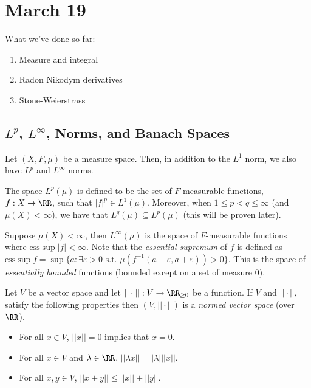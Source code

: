 \documentclass{../uva7310}
\begin{document}
\section{March 19}

What we've done so far:
\begin{enumerate}
    \item Measure and integral
    \item Radon Nikodym derivatives
    \item Stone-Weierstrass
\end{enumerate}

\subsection{\( L^p \), \( L^\infty \), Norms, and Banach Spaces}

Let \((X,F,\mu)\) be a measure space. Then, in addition to the \(L^1\) norm, we also have \(L^p\) and \(L^\infty \)
norms.

\begin{definition}[\(L^p\)-space]
    The space \(L^p(\mu)\) is defined to be the set of \(F\)-measurable functions, \(f:X\rightarrow\RR \), such that
    \(|f|^p\in L^1(\mu)\). Moreover, when \(1\leq p<q\leq\infty \) (and \(\mu(X)<\infty \)), we have that
    \(L^q(\mu)\subseteq L^p(\mu)\) (this will be proven later).
\end{definition}

\begin{definition}
    Suppose \(\mu(X)<\infty \), then \(L^\infty(\mu)\) is the space of \(F\)-measurable functions where
    \(\text{ess}\sup |f|<\infty \). Note that the \textit{essential supremum} of \(f\) is defined as
    \(\text{ess}\sup f=\sup \{a:\exists\varepsilon>0\text{ s.t. } \mu(f^{-1}(a-\varepsilon,a+\varepsilon))>0\} \).
    This is the space of \textit{essentially bounded} functions (bounded except on a set of measure 0).
\end{definition}

\begin{definition}
    Let \(V\) be a vector space and let \(||\cdot||:V\rightarrow\RR_{\geq0}\) be a function. If \(V\) and \(||\cdot||\),
    satisfy the following properties then \((V,||\cdot||)\) is a \textit{normed vector space} (over \(\RR \)). 
    \begin{itemize}
        \item For all \(x\in V\), \(||x||=0\) implies that \(x=0\).
        \item For all \(x\in V\) and \(\lambda\in\RR \), \(||\lambda x||=|\lambda| ||x||\).
        \item For all \(x,y\in V\), \(||x+y||\leq ||x||+||y||\).
    \end{itemize}
\end{definition}
\end{document}
